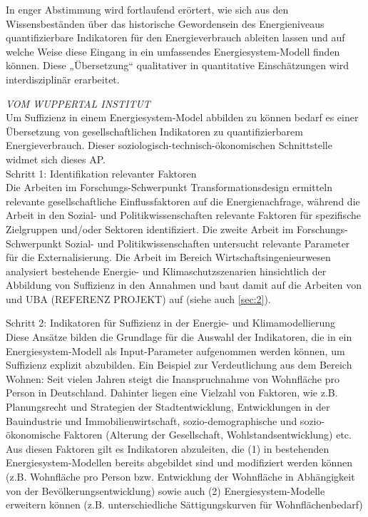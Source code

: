 \documentclass[a4paper,11pt,twoside]{scrartcl}
\begin{document}
In enger Abstimmung wird fortlaufend erörtert, wie sich aus den Wissensbeständen über das historische Gewordensein des Energieniveaus quantifizierbare Indikatoren für den Energieverbrauch ableiten lassen und auf welche Weise diese Eingang in ein umfassendes Energiesystem-Modell finden können. Diese „Übersetzung“ qualitativer in quantitative Einschätzungen wird interdisziplinär erarbeitet.

\textit{VOM WUPPERTAL INSTITUT}\\
Um Suffizienz in einem Energiesystem-Model abbilden zu können bedarf es einer Übersetzung von gesellschaftlichen Indikatoren zu quantifizierbarem Energieverbrauch. Dieser soziologisch-technisch-ökonomischen Schnittstelle widmet sich dieses AP.\\ 
Schritt 1: Identifikation relevanter Faktoren\\
Die Arbeiten im Forschungs-Schwerpunkt Transformationsdesign ermitteln relevante gesellschaftliche Einflussfaktoren auf die Energienachfrage, während die Arbeit in den Sozial- und Politikwissenschaften relevante Faktoren für spezifische Zielgruppen und/oder Sektoren identifiziert. Die zweite Arbeit im Forschungs-Schwerpunkt Sozial- und Politikwissenschaften untersucht relevante Parameter für die Externalisierung. Die Arbeit im Bereich Wirtschaftsingenieurwesen analysiert bestehende Energie- und Klimaschutzszenarien hinsichtlich der Abbildung von Suffizienz in den Annahmen und baut damit auf die Arbeiten von \cite{SAMADI2017} und UBA (REFERENZ PROJEKT) auf (siehe auch \ref{sec:2}).

Schritt 2: Indikatoren für Suffizienz in der Energie- und Klimamodellierung\\
Diese Ansätze bilden die Grundlage für die Auswahl der Indikatoren, die in ein Energiesystem-Modell als Input-Parameter aufgenommen werden können, um Suffizienz explizit abzubilden.  
Ein Beispiel zur Verdeutlichung aus dem Bereich Wohnen: Seit vielen Jahren steigt die Inanspruchnahme von Wohnfläche pro Person in Deutschland. Dahinter liegen eine Vielzahl von Faktoren, wie z.B. Planungsrecht und Strategien der Stadtentwicklung, Entwicklungen in der Bauindustrie und Immobilienwirtschaft, sozio-demographische und sozio-ökonomische Faktoren (Alterung der Gesellschaft, Wohlstandsentwicklung) etc. 
Aus diesen Faktoren gilt es Indikatoren abzuleiten, die (1) in bestehenden Energiesystem-Modellen bereits abgebildet sind und modifiziert werden können (z.B. Wohnfläche pro Person bzw. Entwicklung der Wohnfläche in Abhängigkeit von der Bevölkerungsentwicklung) sowie auch (2) Energiesystem-Modelle erweitern können (z.B. unterschiedliche Sättigungskurven für Wohnflächenbedarf)
\end{document}
